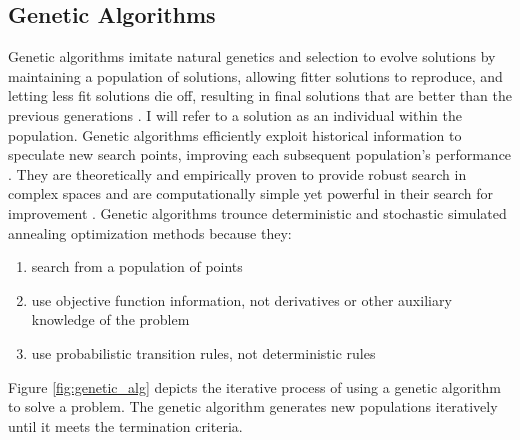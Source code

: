 \subsection{Genetic Algorithms}
\label{sec:genetic_alg}
Genetic algorithms imitate natural genetics and selection to evolve solutions 
by maintaining a population of solutions, allowing fitter solutions to reproduce,
and letting less fit solutions die off, resulting in final solutions that are 
better than the previous generations \cite{renner_genetic_2003}. 
I will refer to a solution as an individual within the population. 
Genetic algorithms efficiently exploit historical information to speculate new
 search points, improving each subsequent population's performance 
\cite{goldberg_genetic_1989}. 
They are theoretically and empirically proven to provide robust 
search in complex spaces and are computationally simple yet powerful 
in their search for improvement \cite{goldberg_genetic_1989}. 
Genetic algorithms trounce deterministic and stochastic simulated 
annealing optimization methods because they:
\begin{enumerate}
    \item search from a population of points
    \item use objective function information, not derivatives or other 
    auxiliary knowledge of the problem
    \item use probabilistic transition rules, not deterministic rules
\end{enumerate}
Figure \ref{fig:genetic_alg} depicts the iterative process of using a genetic algorithm
to solve a problem. 
The genetic algorithm generates new populations iteratively until it meets the termination 
criteria. 
